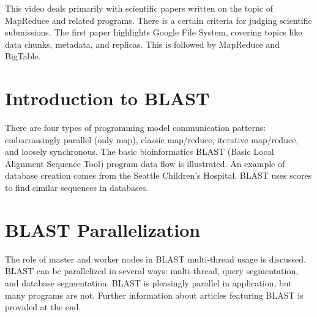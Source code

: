 This video deals primarily with scientific papers written on the topic
of MapReduce and related programs. There is a certain criteria for
judging scientific submissions. The first paper highlights Google File
System, covering topics like data chunks, metadata, and replicas. This
is followed by MapReduce and BigTable.



\section{Introduction to BLAST}

There are four types of programming model communication patterns:
embarrassingly parallel (only map), classic map/reduce, iterative
map/reduce, and loosely synchronous. The basic bioinformatics BLAST
(Basic Local Alignment Sequence Tool) program data flow is illustrated.
An example of database creation comes from the Seattle Children's
Hospital. BLAST uses scores to find similar sequences in databases.



\section{BLAST Parallelization}

The role of master and worker nodes in BLAST multi-thread usage is
discussed. BLAST can be parallelized in several ways: multi-thread,
query segmentation, and database segmentation. BLAST is pleasingly
parallel in application, but many programs are not. Further information
about articles featuring BLAST is provided at the end.



